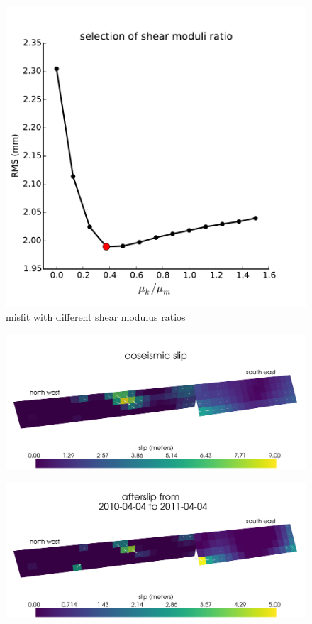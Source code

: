 \documentclass[12pt]{article}
\begin{document}
\begin{figure}
\includegraphics[scale=1.0]{Figures/shear_ratio}
\centering 
\caption{misfit with different shear modulus ratios}
\label{ShearRatio}
\end{figure} 

\begin{figure}
\includegraphics[scale=0.1]{Figures/final_coseismic}
\centering 
\caption{}
\label{FinalCoseismic}
\end{figure} 

\begin{figure}
\includegraphics[scale=0.1]{Figures/final_afterslip_0-1}
\centering 
\caption{}
\label{ShearRatio}
\end{figure} 
\end{document}
